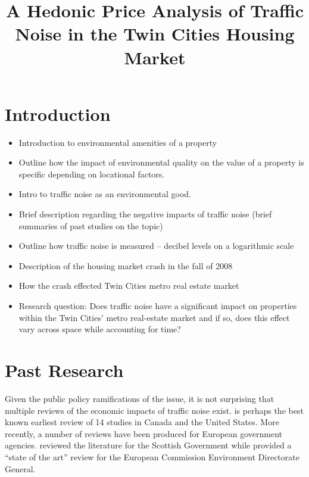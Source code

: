\documentclass{article}\usepackage{graphicx, color}
\title{A Hedonic Price Analysis of Traffic Noise in the Twin Cities Housing Market}
\begin{document}
\maketitle

\section{Introduction}

\begin{itemize}
\item Introduction to environmental amenities of a property
\item Outline how the impact of environmental quality on the value of a property is specific depending on locational factors.
\item Intro to traffic noise as an environmental good.
\item Brief description regarding the negative impacts of traffic noise (brief summaries of past studies on the topic)
\item Outline how traffic noise is measured – decibel levels on a logarithmic scale
\item Description of the housing market crash in the fall of 2008
\item How the crash effected Twin Cities metro real estate market
\item Research question: Does traffic noise have a significant impact on properties within the Twin Cities’ metro real-estate market and if so, does this effect vary across space while accounting for time?
\end{itemize}

\section{Past Research}\label{sec:lit}
Given the public policy ramifications of the issue, it is not surprising that multiple reviews of the economic impacts of traffic noise exist. \citet{Nelson1982} is perhaps the best known earliest review of 14 studies in Canada and the United States. More recently, a number of reviews have been produced for European government agencies. \citet{Bateman2001} reviewed the literature for the Scottish Government while \citet{Navrud2002} provided a ``state of the art'' review for the European Commission Environment Directorate General. 
\end{document}
